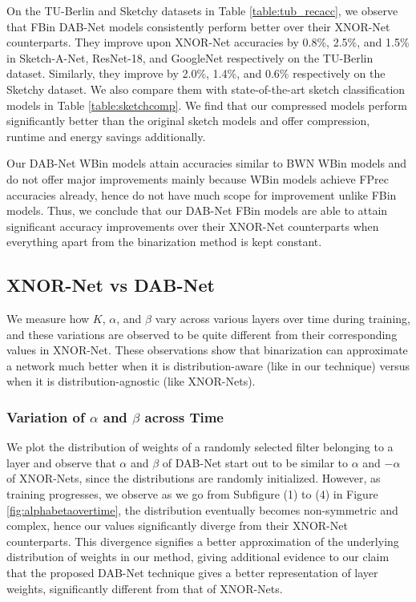 \noindent On the TU-Berlin and Sketchy datasets in Table \ref{table:tub_recacc}, we observe that FBin DAB-Net models consistently perform better over their XNOR-Net counterparts. They improve upon XNOR-Net accuracies by 0.8\%, 2.5\%, and 1.5\% in Sketch-A-Net, ResNet-18, and GoogleNet respectively on the TU-Berlin dataset. Similarly, they improve by 2.0\%, 1.4\%, and 0.6\% respectively on the Sketchy dataset. We also compare them with state-of-the-art sketch classification models in Table \ref{table:sketchcomp}. We find that our compressed models perform significantly better than the original sketch models and offer compression, runtime and energy savings additionally.





\noindent Our DAB-Net WBin models attain accuracies similar to BWN WBin models and do not offer major  improvements mainly because WBin models achieve FPrec accuracies already, hence do not have much scope for improvement unlike FBin models. Thus, we conclude that our DAB-Net FBin models are able to attain significant accuracy improvements over their XNOR-Net counterparts when everything apart from the binarization method is kept constant.


\subsection{XNOR-Net vs DAB-Net}

\noindent We measure how $K$, $\alpha$, and $\beta$ vary across various layers over time during training, and these variations are observed to be quite different from their corresponding values in XNOR-Net. These observations show that binarization can approximate a network much better when it is distribution-aware (like in our technique) versus when it is distribution-agnostic (like XNOR-Nets).

\subsubsection{Variation of $\alpha$ and $\beta$ across Time}

\noindent We plot the distribution of weights of a randomly selected filter belonging to a layer and observe that $\alpha$ and $\beta$ of DAB-Net start out to be similar to $\alpha$ and $-\alpha$ of XNOR-Nets, since the distributions are randomly initialized. However, as training progresses, we observe as we go from Subfigure (1) to (4) in Figure \ref{fig:alphabetaovertime}, the distribution eventually becomes non-symmetric and complex, hence our values  significantly diverge from their XNOR-Net counterparts. This divergence signifies a better approximation of the underlying distribution of weights in our method, giving additional evidence to our claim that the proposed DAB-Net technique gives a better representation of layer weights, significantly different from that of XNOR-Nets.


